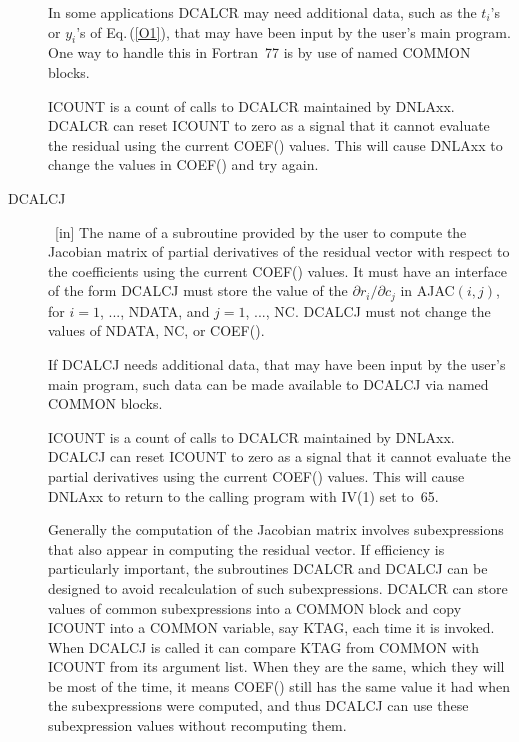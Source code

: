 \documentclass[twoside]{MATH77}
\begin{document}
\begin{description}
In some applications DCALCR may need additional data, such as the $%
t_i$'s or $y_i$'s of Eq.\,(\ref{O1}), that may have been
input by the user's main program. One way to handle this in Fortran~77 is by
use of named COMMON blocks.

ICOUNT is a count of calls to DCALCR maintained by DNLAxx. DCALCR can
reset ICOUNT to zero as a signal that it cannot evaluate the residual using
the current COEF() values. This will cause DNLAxx to change the values in
COEF() and try again.

\item[DCALCJ]  \ [in] The name of a subroutine provided by the user to
compute the Jacobian matrix of partial derivatives of the residual vector
with respect to the coefficients using the current COEF() values. It must
have an interface of the form
\vspace{-8pt}{\tt \begin{tabbing}
SUBROUTINE DCALCJ(NDATA, NC, COEF, ICOUNT,\\
\ \ \ AJAC)\\
INTEGER NDATA, NC, ICOUNT\\
DOUBLE PRECISION COEF(NC), AJAC(NDATA, NC)
\end{tabbing}}\vspace{-8pt}
DCALCJ must store the value of the $\partial r_i / \partial c_j$ in AJAC$(i,j)$,
for $i=1$, ..., NDATA, and $j=1$, ..., NC. DCALCJ must not change the
values of NDATA, NC, or COEF().

If DCALCJ needs additional data, that may have been input by the user's main
program, such data can be made available to DCALCJ via named COMMON blocks.

ICOUNT is a count of calls to DCALCR maintained by DNLAxx. DCALCJ can
reset ICOUNT to zero as a signal that it cannot evaluate the partial
derivatives using the current COEF() values. This will cause DNLAxx to
return to the calling program with IV(1) set to~65.

Generally the computation of the Jacobian matrix involves subexpressions
that also appear in computing the residual vector. If efficiency is
particularly important, the subroutines DCALCR and DCALCJ can be designed to
avoid recalculation of such subexpressions. DCALCR can store values of
common subexpressions into a COMMON block and copy ICOUNT into a COMMON
variable, say KTAG, each time it is invoked. When DCALCJ is called it can
compare KTAG from COMMON with ICOUNT from its argument list. When they are
the same, which they will be most of the time, it means COEF() still has the
same value it had when the subexpressions were computed, and thus DCALCJ can
use these subexpression values without recomputing them.


\end{description}
\end{document}
